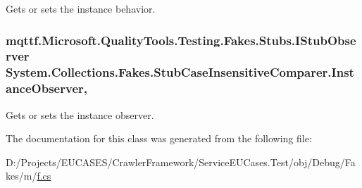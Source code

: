 Gets or sets the instance behavior.

\hypertarget{class_system_1_1_collections_1_1_fakes_1_1_stub_case_insensitive_comparer_a504c0525e9fe0a3d89d6dfb8381e2124}{
\subsubsection[{Instance\-Observer}]{\setlength{\rightskip}{0pt plus 5cm}mqttf.\-Microsoft.\-Quality\-Tools.\-Testing.\-Fakes.\-Stubs.\-I\-Stub\-Observer System.\-Collections.\-Fakes.\-Stub\-Case\-Insensitive\-Comparer.\-Instance\-Observer\hspace{0.3cm}{\ttfamily [get]}, {\ttfamily [set]}}}\label{class_system_1_1_collections_1_1_fakes_1_1_stub_case_insensitive_comparer_a504c0525e9fe0a3d89d6dfb8381e2124}


Gets or sets the instance observer.



The documentation for this class was generated from the following file\-:\begin{DoxyCompactItemize}
\item 
D\-:/\-Projects/\-E\-U\-C\-A\-S\-E\-S/\-Crawler\-Framework/\-Service\-E\-U\-Cases.\-Test/obj/\-Debug/\-Fakes/m/\hyperlink{m_2f_8cs}{f.\-cs}\end{DoxyCompactItemize}
